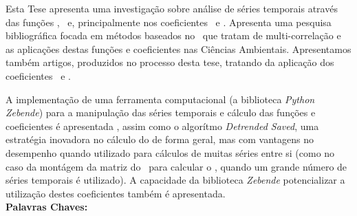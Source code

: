 \begin{thesisresumo}

Esta Tese apresenta uma investigação sobre análise de séries temporais através das funções \dfa, \dcca~e, principalmente nos coeficientes \pdcca~e \dmc. Apresenta uma pesquisa bibliográfica focada em métodos baseados no \dfa~que tratam de multi-correlação e as aplicações destas funções e coeficientes nas Ciências Ambientais. Apresentamos também artigos, produzidos no processo desta tese, tratando da aplicação dos coeficientes \pdcca~e \dmc.
    
A implementação de uma ferramenta computacional (a biblioteca \emph{Python} \emph{Zebende}) para a manipulação das séries temporais e cálculo das funções e coeficientes é apresentada , assim como o algorítmo \emph{Detrended Saved}, uma estratégia inovadora no cálculo do \dcca de forma geral, mas com vantagens no desempenho quando utilizado para cálculos de muitas séries entre si (como no caso da montágem da matriz do \pdcca~para calcular o \dmc, quando um grande número de séries temporais é utilizado). A capacidade da biblioteca \emph{Zebende} potencializar a utilização destes coeficientes também é apresentada.
\\

\textbf{Palavras Chaves:} \ppgmpalavraschave

\end{thesisresumo}
